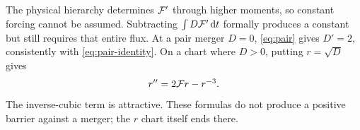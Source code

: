The physical hierarchy determines $\mathcal F'$ through higher moments, so
constant forcing cannot be assumed. Subtracting $\int D\mathcal F'\,\mathrm d t$
formally produces a constant but still requires that entire flux.
At a pair merger $D=0$, \eqref{eq:pair} gives $D'=2$, consistently
with \eqref{eq:pair-identity}. On a chart where $D>0$, putting
$r=\sqrt D$ gives
\begin{equation}
 r''=2\mathcal F r-r^{-3}.
\end{equation}
The inverse-cubic term is attractive. These formulas do not produce
a positive barrier against a merger; the $r$ chart itself ends there.
